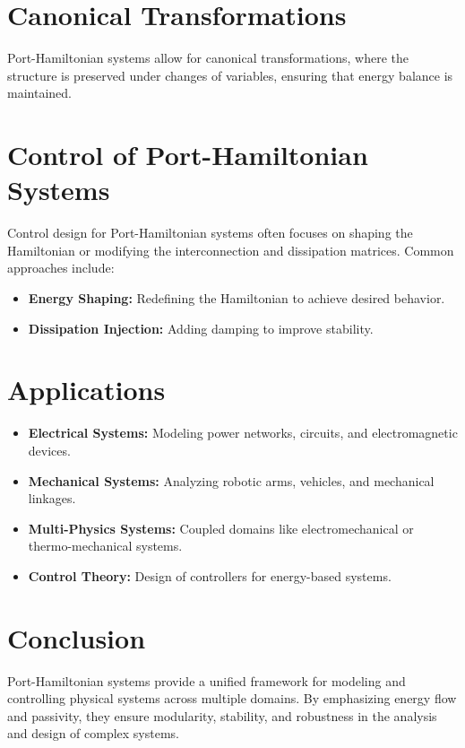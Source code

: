 \section{Canonical Transformations}
Port-Hamiltonian systems allow for canonical transformations, where the structure is preserved under changes of variables, ensuring that energy balance is maintained.

\section*{Control of Port-Hamiltonian Systems}
Control design for Port-Hamiltonian systems often focuses on shaping the Hamiltonian or modifying the interconnection and dissipation matrices. Common approaches include:
\begin{itemize}
    \item \textbf{Energy Shaping:} Redefining the Hamiltonian to achieve desired behavior.
    \item \textbf{Dissipation Injection:} Adding damping to improve stability.
\end{itemize}

\section{Applications}
\begin{itemize}
    \item \textbf{Electrical Systems:} Modeling power networks, circuits, and electromagnetic devices.
    \item \textbf{Mechanical Systems:} Analyzing robotic arms, vehicles, and mechanical linkages.
    \item \textbf{Multi-Physics Systems:} Coupled domains like electromechanical or thermo-mechanical systems.
    \item \textbf{Control Theory:} Design of controllers for energy-based systems.
\end{itemize}

\section{Conclusion}
Port-Hamiltonian systems provide a unified framework for modeling and controlling physical systems across multiple domains. By emphasizing energy flow and passivity, they ensure modularity, stability, and robustness in the analysis and design of complex systems.

